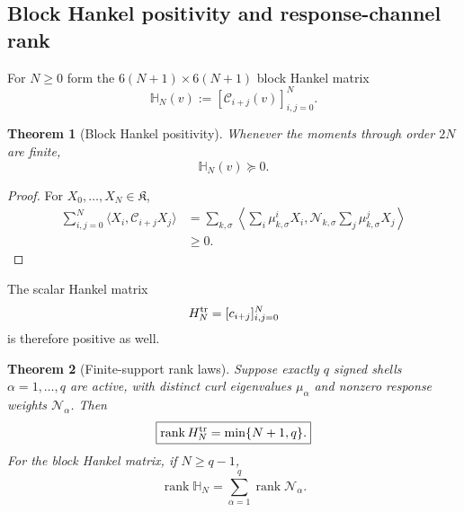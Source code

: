 \documentclass[
 aps,
 prd,
 reprint,
 amsmath,
 amssymb,
 nofootinbib,
 superscriptaddress
]{revtex4-2}
\newtheorem{theorem}{Theorem}[section]
\theoremstyle{definition}
\theoremstyle{remark}
\newcommand{\cK}{\mathfrak K}
\newcommand{\cC}{\mathscr C}
\newcommand{\cN}{\mathscr N}
\begin{document}
\subsection{Block Hankel positivity and response-channel rank}

For $N\ge0$ form the $6(N+1)\times6(N+1)$ block Hankel matrix
\begin{equation}
 \mathbb H_N(v)
 :=
 [\cC_{i+j}(v)]_{i,j=0}^N.
 \label{R:cf:eq:blockHankel}
\end{equation}

\begin{theorem}[Block Hankel positivity]
\label{R:cf:thm:blockpositive}
Whenever the moments through order $2N$ are finite,
\begin{equation}
 \boxed{
 \mathbb H_N(v)\succeq0.
 }
 \label{R:cf:eq:blockpositive}
\end{equation}
\end{theorem}

\begin{proof}
For $X_0,\ldots,X_N\in\cK$,
\begin{align*}
 \sum_{i,j=0}^N
 \langle X_i,\cC_{i+j}X_j\rangle
 &=
 \sum_{k,\sigma}
 \left\langle
 \sum_i\mu_{k,\sigma}^iX_i,
 \cN_{k,\sigma}
 \sum_j\mu_{k,\sigma}^jX_j
 \right\rangle\\
 &\ge0.
\end{align*}
\end{proof}

The scalar Hankel matrix
\[
       H_N^{\rm tr}
       =
       [c_{i+j}]_{i,j=0}^N
\]
is therefore positive as well.

\begin{theorem}[Finite-support rank laws]
\label{R:cf:thm:ranklaws}
Suppose exactly $q$ signed shells
$\alpha=1,\ldots,q$ are active, with distinct curl eigenvalues
$\mu_\alpha$ and nonzero response weights $\cN_\alpha$.  Then
\begin{equation}
 \boxed{
 \operatorname{rank}H_N^{\rm tr}
 =
 \min\{N+1,q\}.
 }
 \label{R:cf:eq:scalarrank}
\end{equation}
For the block Hankel matrix, if $N\ge q-1$,
\begin{equation}
 \boxed{
 \operatorname{rank}\mathbb H_N
 =
 \sum_{\alpha=1}^q
 \operatorname{rank}\cN_\alpha.
 }
 \label{R:cf:eq:blockrank}
\end{equation}
\end{theorem}
\end{document}
